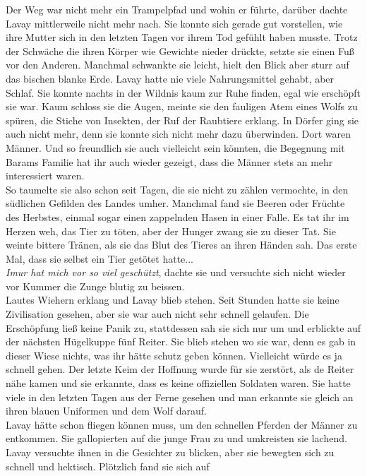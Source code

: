 Der Weg war nicht mehr ein Trampelpfad und wohin er führte, darüber dachte Lavay mittlerweile nicht 
mehr nach. Sie konnte sich gerade gut vorstellen, wie ihre Mutter sich in den letzten Tagen vor 
ihrem Tod gefühlt haben musste. Trotz der Schwäche die ihren Körper wie Gewichte nieder drückte, 
setzte sie einen Fuß vor den Anderen. Manchmal schwankte sie leicht, hielt den Blick aber sturr auf 
das bischen blanke Erde. Lavay hatte nie viele Nahrungsmittel gehabt, aber Schlaf. Sie konnte 
nachts in der Wildnis kaum zur Ruhe finden, egal wie erschöpft sie war. Kaum schloss sie die Augen, 
meinte sie den fauligen Atem eines Wolfs zu spüren, die Stiche von Insekten, der Ruf der Raubtiere 
erklang. In Dörfer ging sie auch nicht mehr, denn sie konnte sich nicht mehr dazu überwinden. Dort 
waren Männer. Und so freundlich sie auch vielleicht sein könnten, die Begegnung mit Barams Familie 
hat ihr auch wieder gezeigt, dass die Männer stets an mehr interessiert waren. \\
So taumelte sie also schon seit Tagen, die sie nicht zu zählen vermochte, in den südlichen Gefilden 
des Landes umher. Manchmal fand sie Beeren oder Früchte des Herbstes, einmal sogar einen zappelnden 
Hasen in einer Falle. Es tat ihr im Herzen weh, das Tier zu töten, aber der Hunger zwang sie zu 
dieser Tat. Sie weinte bittere Tränen, als sie das Blut des Tieres an ihren Händen sah. Das erste 
Mal, dass sie selbst ein Tier getötet hatte...\\
\textit{Imur hat mich vor so viel geschützt}, dachte sie und versuchte sich nicht wieder vor Kummer 
die Zunge blutig zu beissen.\\
Lautes Wiehern erklang und Lavay blieb stehen. Seit Stunden hatte sie keine Zivilisation gesehen, 
aber sie war auch nicht sehr schnell gelaufen. Die Erschöpfung ließ keine Panik zu, stattdessen sah 
sie sich nur um und erblickte auf der nächsten Hügelkuppe fünf Reiter. Sie blieb stehen wo sie war, 
denn es gab in dieser Wiese nichts, was ihr hätte schutz geben können. Vielleicht würde es ja 
schnell gehen. Der letzte Keim der Hoffnung wurde für sie zerstört, als de Reiter nähe kamen und 
sie erkannte, dass es keine offiziellen Soldaten waren. Sie hatte viele in den letzten Tagen aus 
der Ferne gesehen und man erkannte sie gleich an ihren blauen Uniformen und dem Wolf darauf.\\ 
Lavay hätte schon fliegen können muss, um den schnellen Pferden der Männer zu entkommen. Sie 
gallopierten auf die junge Frau zu und umkreisten sie lachend. Lavay versuchte ihnen in die 
Gesichter zu blicken, aber sie bewegten sich zu schnell und hektisch. Plötzlich fand sie sich auf 
